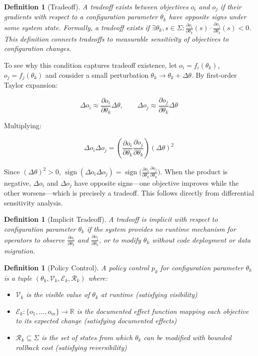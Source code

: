 \documentclass[conference]{IEEEtran}
\newtheorem{definition}[theorem]{Definition}
\begin{document}
\begin{definition}[Tradeoff]
A tradeoff exists between objectives $o_i$ and $o_j$ if their gradients with respect to a configuration parameter $\theta_k$ have opposite signs under some system state. Formally, a tradeoff exists if $\exists \theta_k, s \in \Sigma: \frac{\partial o_i}{\partial \theta_k}(s) \cdot \frac{\partial o_j}{\partial \theta_k}(s) < 0$.
This definition connects tradeoffs to measurable sensitivity of objectives to configuration changes.
\end{definition}

To see why this condition captures tradeoff existence, let $o_i = f_i(\theta_k)$, $o_j = f_j(\theta_k)$ and consider a small perturbation $\theta_k \to \theta_k + \Delta\theta$. By first-order Taylor expansion:

\[
\Delta o_i \approx \frac{\partial o_i}{\partial \theta_k} \Delta\theta, \qquad
\Delta o_j \approx \frac{\partial o_j}{\partial \theta_k} \Delta\theta
\]

Multiplying:

\[
\Delta o_i \Delta o_j = \left(\frac{\partial o_i}{\partial \theta_k} \frac{\partial o_j}{\partial \theta_k}\right) (\Delta\theta)^2
\]

Since $(\Delta\theta)^2 > 0$, $\operatorname{sign}(\Delta o_i \Delta o_j) = \operatorname{sign}\bigl(\frac{\partial o_i}{\partial \theta_k} \frac{\partial o_j}{\partial \theta_k}\bigr)$. When the product is negative, $\Delta o_i$ and $\Delta o_j$ have opposite signs---one objective improves while the other worsens---which is precisely a tradeoff. This follows directly from differential sensitivity analysis.

\begin{definition}[Implicit Tradeoff]
A tradeoff is \textit{implicit} with respect to configuration parameter $\theta_k$ if the system provides no runtime mechanism for operators to observe $\frac{\partial o_i}{\partial \theta_k}$ and $\frac{\partial o_j}{\partial \theta_k}$, or to modify $\theta_k$ without code deployment or data migration.
\end{definition}

\begin{definition}[Policy Control]
A policy control $p_k$ for configuration parameter $\theta_k$ is a tuple $(\theta_k, \mathcal{V}_k, \mathcal{E}_k, \mathcal{R}_k)$ where:
\begin{itemize}
    \item $\mathcal{V}_k$ is the visible value of $\theta_k$ at runtime (satisfying visibility)
    \item $\mathcal{E}_k: \{o_1,\ldots,o_m\} \to \mathbb{R}$ is the documented effect function mapping each objective to its expected change (satisfying documented effects)
    \item $\mathcal{R}_k \subseteq \Sigma$ is the set of states from which $\theta_k$ can be modified with bounded rollback cost (satisfying reversibility)
\end{itemize}
\end{definition}
\end{document}
